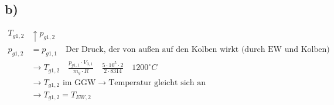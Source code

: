 

\subsection*{b)}
\begin{align*}
    T_{g1,2} &\uparrow p_{g1,2} \\
    p_{g1,2} &= p_{g1,1} \quad \text{Der Druck, der von außen auf den Kolben wirkt (durch EW und Kolben) verändert sich nicht.} \\
    &\rightarrow T_{g1,2} \quad \frac{p_{g1,1} \cdot V_{3,1}}{m_g \cdot R} \quad \frac{5 \cdot 10^5 \cdot 2}{2 \cdot 8314} \quad 1200^\circ C \\
    &\rightarrow T_{g1,2} \text{ im GGW} \rightarrow \text{Temperatur gleicht sich an} \\
    &\rightarrow T_{g1,2} = T_{EW,2}
\end{align*}